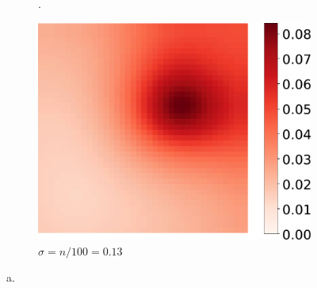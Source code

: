 \begin{figure}
\begin{subfigure}[t]{0.31\textwidth}
    \caption{.}%
    \label{fig:MU_fibre_distribution_13x13_10_fibers_mu9}%
  \end{subfigure}
  \quad
  \begin{subfigure}[t]{0.31\textwidth}%
    \centering%
    \includegraphics[width=\textwidth]{images/motor_unit_assignment/MU_fibre_distribution_37x37_50_fibers_mu41.pdf}%
    \caption{$\sigma = n/100 = 0.13$}%
    \label{fig:MU_fibre_distribution_37x37_50_fibers_mu41}%
  \end{subfigure}
  \caption{a.}%
  \label{fig:extraction_result}%
\end{figure}%

